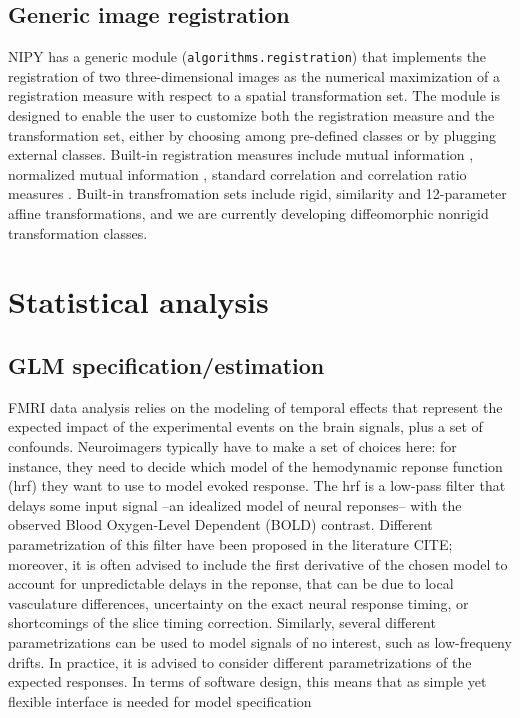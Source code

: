 \documentclass{bioinfo}
\begin{document}
\subsection{Generic image registration}

NIPY has a generic module ({\tt algorithms.registration}) that
implements the registration of two three-dimensional images as the
numerical maximization of a registration measure with respect to a
spatial transformation set. The module is designed to enable the user
to customize both the registration measure and the transformation set,
either by choosing among pre-defined classes or by plugging external
classes. Built-in registration measures include mutual information
\citep{maes:tmi:97}, normalized mutual information
\citep{studholme:pr:98}, standard correlation and correlation ratio
measures \citep{roche:ijist:00}. Built-in transfromation sets include
rigid, similarity and 12-parameter affine transformations, and we are
currently developing diffeomorphic nonrigid transformation classes.





\section{Statistical analysis}

\subsection{GLM specification/estimation}

FMRI data analysis relies on the modeling of temporal effects that
represent the expected impact of the experimental events on the brain
signals, plus a set of confounds.
%
Neuroimagers typically have to make a set of choices here: for
instance, they need to decide which model of the hemodynamic reponse
function (hrf) they want to use to model evoked response. 
%
The hrf is a low-pass filter that delays some input signal --an
idealized model of neural reponses-- with the observed Blood
Oxygen-Level Dependent (BOLD) contrast.
%
Different parametrization of this filter have been proposed in the
literature CITE; moreover, it is often advised to include the first
derivative of the chosen model to account for unpredictable delays in
the reponse, that can be due to local vasculature differences,
uncertainty on the exact neural response timing, or shortcomings of
the slice timing correction.
%
Similarly, several different parametrizations can be used to model
signals of no interest, such as low-frequeny drifts.
%
In practice, it is advised to consider different parametrizations of
the expected responses.
% 
In terms of software design, this means that as simple yet flexible
interface is needed for model specification
\end{document}
